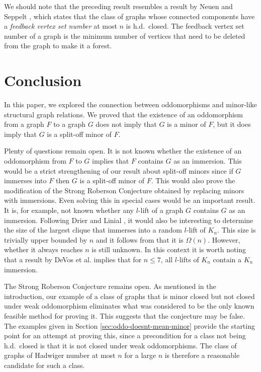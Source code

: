 \documentclass[11pt]{article}
\begin{document}
We should note that the preceding result resembles a result by Neuen and Seppelt \cite{neuen2026distinguishinggraphscountinghomomorphisms}, which states that the class of graphs whose connected components have a \emph{feedback vertex set number} at most $n$ is h.d.\ closed. 
The feedback vertex set number of a graph is the minimum number of vertices that need to be deleted from the graph to make it a forest.




\section{Conclusion}

In this paper, we explored the connection between oddomorphisms and minor-like structural graph relations.
We proved that the existence of an oddomorphism from a graph $F$ to a graph $G$ does not imply that $G$ is a minor of $F$, but it does imply that $G$ is a split-off minor of $F$.
\par 
Plenty of questions remain open.
It is not known whether the existence of an oddomorphism from $F$ to $G$ implies that $F$ contains $G$ as an immersion. This would be a strict strengthening of our result about split-off minors since if $G$ immerses into $F$ then $G$ is a split-off minor of $F$. This would also prove the modification of the Strong Roberson Conjecture obtained by replacing minors with immersions.
Even solving this in special cases would be an important result. It is, for example, not known whether any $l$-lift of a graph $G$ contains $G$ as an immersion. Following Drier and Linial \cite{Drier2004Minors}, it would also be interesting to determine the size of the largest clique that immerses into a random $l$-lift of $K_n$. This size is trivially upper bounded by $n$ and it follows from \cite{GAUTHIER201998} that it is $\Omega(n)$. However, whether it always reaches $n$ is still unknown.
In this context it is worth noting that a result by DeVos et al. \cite{devos2010immersing} implies that for $n\leq 7$, all $l$-lifts of $K_n$ contain a $K_n$ immersion.
\par 
The Strong Roberson Conjecture remains open. As mentioned in the introduction, our example of a class of graphs that is minor closed but not closed under weak oddomorphism eliminates what was considered to be the only known feasible method for proving it. 
This suggests that the conjecture may be false.
The examples given in Section \ref{sec:oddo-doesnt-mean-minor} provide the starting point for an attempt at proving this, since a precondition for a class not being h.d.\ closed is that it is not closed under weak oddomorphisms.
The class of graphs of Hadwiger number at most $n$ for a large $n$ is therefore a reasonable candidate for such a class.
\end{document}
